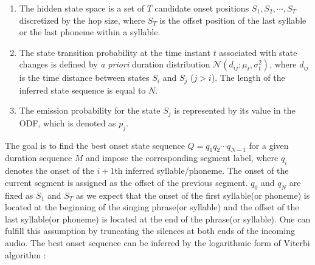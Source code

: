 \begin{enumerate}[leftmargin=*, itemsep=0pt]
    \item The hidden state space is a set of $T$ candidate onset positions $S_1, S_2, \cdots, S_T$ discretized by the hop size, where $S_{T}$ is the offset position of the last syllable or the last phoneme within a syllable.
    \item The state transition probability at the time instant $t$ associated with state changes is defined by \textit{a priori} duration distribution $\mathcal{N} (d_{ij} ; \mu_t, \sigma_t^2)$, where $d_{ij}$ is the time distance between states $S_i$ and $S_j$ ($j>i$). The length of the inferred state sequence is equal to $N$.
    \item The emission probability for the state $S_j$ is represented by its value in the ODF, which is denoted as $p_j$.
\end{enumerate} 

The goal is to find the best onset state sequence $Q={q_1 q_2 \cdots q_{N-1}}$ for a given duration sequence $M$ and impose the corresponding segment label, where $q_i$ denotes the onset of the $i+1$th inferred syllable/phoneme. The onset of the current segment is assigned as the offset of the previous segment. $q_0$ and $q_N$ are fixed as $S_1$ and $S_T$ as we expect that the onset of the first syllable(or phoneme) is located at the beginning of the singing phrase(or syllable) and the offset of the last syllable(or phoneme) is located at the end of the phrase(or syllable). One can fulfill this assumption by truncating the silences at both ends of the incoming audio. The best onset sequence can be inferred by the logarithmic form of Viterbi algorithm \cite{rabiner1989tutorial}:

